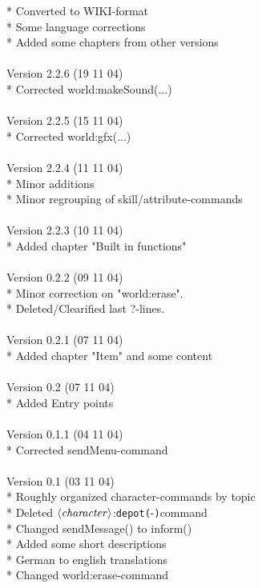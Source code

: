 \documentclass[a4paper,10pt,makeidx]{scrreprt}
\newcommand{\com}[2]{\index{#1}\texttt{#1(}#2\texttt{)}}
\newcommand{\var}[1]{$\left\langle \text{\emph{#1}} \right\rangle$}
\begin{document}
* Converted to WIKI-format\\
* Some language corrections\\
* Added some chapters from other versions\\
\\
Version 2.2.6 (19 11 04)\\
* Corrected world:makeSound(...)\\
\\
Version 2.2.5 (15 11 04)\\
* Corrected world:gfx(...)\\
\\
Version 2.2.4 (11 11 04)\\
* Minor additions\\
* Minor regrouping of skill/attribute-commands\\
\\
Version 2.2.3 (10 11 04)\\
* Added chapter "Built in functions"\\
\\
Version 0.2.2 (09 11 04)\\
* Minor correction on "world:erase".\\
* Deleted/Clearified last ?-lines.\\
\\
Version 0.2.1 (07 11 04)\\
* Added chapter "Item" and some content\\
\\
Version 0.2 (07 11 04)\\
* Added Entry points\\
\\
Version 0.1.1 (04 11 04)\\
* Corrected sendMenu-command\\
\\
Version 0.1 (03 11 04)\\
* Roughly organized character-commands by topic\\
* Deleted \var{character}:\com{depot}-command\\
* Changed sendMessage() to inform()\\
* Added some short descriptions\\
* German to english translations\\
* Changed world:erase-command

\printindex
\end{document}
